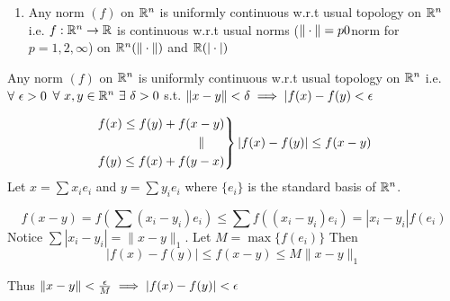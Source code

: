 {\begin{enumerate}
\begin{itemize}
Matrix of $T=\begin{bmatrix}
	a_{11} & a_{12} & \cdots & a_{1n} \\
	a_{21} & a_{22} & \cdots & a_{2n} \\
	\vdots & \vdots & \ddots & \vdots \\
	a_{m1} & a_{m2} & \cdots & a_{mn}
\end{bmatrix}$
\item  $\underset{A}{M_{n\times n}(\bbR)}\underset{\longmapsto}{\to} \underset{det(A)}{\bbR}$ is continuous

$\frac1{\text{det}}:GL_n(\bbR)\to\bbR$ \parinn

Here $M_{n\times n}$ is a vector space of dimension $n^2$ in which $GL_n(\bbR)=\{A\mid \det(A)\neq 0\}$ is an open set.

\item $\underset{A\longmapsto A^{-1}}{ GL_n(\bbR) \to GL_n(\bbR) }$ is continuous.

\end{itemize}
\item Any norm $(f)$ on $\mathbb{R}^n$ is uniformly continuous w.r.t usual topology on $\mathbb{R}^n$ i.e. $f:\mathbb{R}^n\to\mathbb{R}$ is continuous w.r.t usual norms ($\|\cdot\|=p0$norm for $p=1,2,\infty$) on $\mathbb{R}^n(\|\cdot\|)$ and $\mathbb{R}(|\cdot|)$
	\end{enumerate}
}
\begin{Theorem}{}{}
	Any norm $(f)$ on $\mathbb{R}^n$ is uniformly continuous w.r.t usual topology on $\mathbb{R}^n$ i.e. $\forall\ \epsilon>0$ $\forall\ x,y\in\mathbb{R}^n\ \exists\ \delta>0$ s.t. $\|x-y\|<\delta\implies |f(x)-f(y)<\epsilon$
\end{Theorem}
\begin{myproof}
	$$\begin{rcases*}
		f(x)\leq f(y)+f(x-y) \\ \qquad \qquad\qquad \qquad \parallel\\ f(y)\leq f(x)+f(y-x)
	\end{rcases*}|f(x)-f(y)|\leq f(x-y)$$Let $x=\sum x_ie_i$ and $y=\sum y_ie_i$ where $\{e_i\}$ is the standard basis of $\mathbb{R}^n$. 

$$f(x-y)=f\left(\sum (x_i-y_i)e_i\right)\leq \sum f\left((x_i-y_i)e_i\right)=|x_i-y_i|f(e_i)$$ Notice $\sum|x_i-y_i|=\|x-y\|_1$. Let $M=\max\{f(e_i)\}$ Then $$|f(x)-f(y)|\leq f(x-y)\leq M\|x-y\|_1$$

Thus $\|x-y\|<\frac{\epsilon}{M}\implies |f(x)-f(y)|<\epsilon$
\end{myproof}
